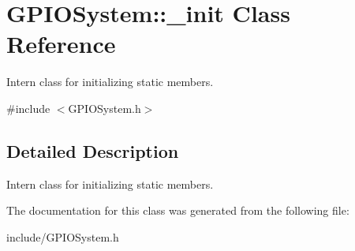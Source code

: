 \hypertarget{classGPIOSystem_1_1__init}{\section{G\-P\-I\-O\-System\-:\-:\-\_\-init Class Reference}
\label{classGPIOSystem_1_1__init}
}


Intern class for initializing static members.  




{\ttfamily \#include $<$G\-P\-I\-O\-System.\-h$>$}



\subsection{Detailed Description}
Intern class for initializing static members. 

The documentation for this class was generated from the following file\-:\begin{DoxyCompactItemize}
\item 
include/G\-P\-I\-O\-System.\-h\end{DoxyCompactItemize}
